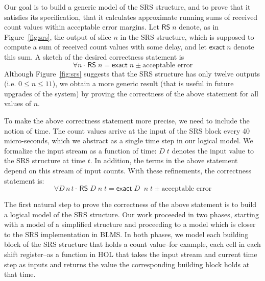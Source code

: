 \documentclass{llncs}
\begin{document}
Our goal is to build a generic model of the SRS structure, and to prove that it satisfies its specification, that it calculates approximate running sums of received count values within acceptable error margins.
Let $\mathsf{RS}\;n$ denote, as in Figure~\ref{fig:srs}, the output of slice $n$ in the SRS structure, which is supposed to compute a sum of received count values with some delay, and let $\mathsf{exact}\;n$ denote this sum.
A sketch of the desired correctness statement is \[\forall{n} \cdot \, \mathsf{RS}\;n= \mathsf{exact}\; n \pm\text{acceptable error}\]
Although Figure~\ref{fig:srs} suggests that the SRS structure has only twelve outputs  (i.e. $0\leq{n}\leq11$), we obtain a more generic result (that is useful in future upgrades of the system) by proving the correctness of the above statement for all values of $n$.

To make the above correctness statement more precise, we need to include the notion of time.
The count values arrive at the input of the SRS block every 40 micro-seconds, which we abstract as a single time step in our logical model.
We formalize the input stream as a function of time: $D\;t$ denotes the input value to the SRS structure at time $t$.
In addition, the terms in the above statement depend on this stream of input counts.
With these refinements, the correctness statement is: \[\forall{D\,n\,t} \cdot \,\mathsf{RS}\;D\;n\;t = \mathsf{exact}\;D\;\;n\;t\pm\text{acceptable error}\]


The first natural step to prove the correctness of the above statement is to build a logical model of the SRS structure.
Our work proceeded in two phases, starting with a model of a simplified structure and proceeding to a model which is closer to the SRS implementation in BLMS.
In both phases, we model each building block of the SRS structure that holds a count value--for example, each cell in each shift register--as a function in HOL that takes the input stream and current time step as inputs and returns the value the corresponding building block holds at that time.
\end{document}
